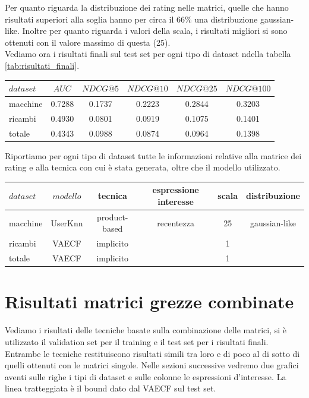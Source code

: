Per quanto riguarda la distribuzione dei rating nelle matrici, quelle che hanno risultati superiori alla soglia hanno per circa il 66\% una distribuzione gaussian-like. Inoltre per quanto riguarda i valori della scala, i risultati migliori si sono ottenuti con il valore massimo di questa (25).\\
Vediamo ora i risultati finali sul test set per ogni tipo di dataset ndella tabella \ref{tab:risultati_finali}.
\begin{center}
    \begin{tabular}{|l|ccccc|}
        \toprule
        $dataset$  & $AUC$ & $NDCG@5$ & $NDCG@10$  & $NDCG@25$ & $NDCG@100$  \\
        \midrule
        macchine & 0.7288 & 0.1737 & 0.2223 & 0.2844 & 0.3203 \\
        ricambi  & 0.4930 &  0.0801 &    0.0919 &  0.1075 & 0.1401 \\
        totale  & 0.4343 &   0.0988  &  0.0874 &  0.0964 & 0.1398 \\
    \bottomrule
    \end{tabular}
    \label{tab:risultati_finali}
\end{center}
Riportiamo per ogni tipo di dataset tutte le informazioni relative alla matrice dei rating e alla tecnica con cui è stata generata, oltre che il modello utilizzato.\\
\begin{center}
    \begin{tabular}{|l|ccccc|}
        \toprule
        $dataset$  & $modello$ & tecnica &espressione interesse & scala & distribuzione  \\
        \midrule
        macchine & UserKnn& product-based &recentezza & 25 & gaussian-like   \\
        ricambi & VAECF& implicito &  & 1  &    \\
        totale & VAECF& implicito &  &  1 &     \\

    \bottomrule
    \end{tabular}
    \label{tab:info_finali}
\end{center}

\section{Risultati matrici grezze combinate}
Vediamo i risultati delle tecniche basate sulla combinazione delle matrici, si è utilizzato il validation set per il training e il test set per i risultati finali.
Entrambe le tecniche restituiscono risultati simili tra loro e di poco al di sotto di quelli ottenuti con le matrici singole. Nelle sezioni successive vedremo due grafici aventi sulle righe i tipi di dataset e sulle colonne le espressioni d'interesse. La linea tratteggiata è il bound dato dal VAECF sul test set.

